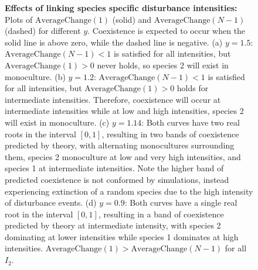 \begin{figure}[htbp]
\caption[Effects of linking species specific disturbance intensities]{\textbf{Effects of linking species specific disturbance intensities:} Plots of $\text{AverageChange}(1)$ (solid) and $\text{AverageChange}(N-1)$ (dashed) for different $y$. Coexistence is expected to occur when the solid line is above zero, while the dashed line is negative. (a) $y=1.5$: $\text{AverageChange}(N-1)<1$ is satisfied for all intensities, but $\text{AverageChange}(1)>0$ never holds, so species 2 will exist in monoculture. (b) $y=1.2$:  $\text{AverageChange}(N-1)<1$ is satisfied for all intensities, but $\text{AverageChange}(1)>0$ holds for intermediate intensities. Therefore, coexistence will occur at intermediate intensities while at low and high intensities, species 2 will exist in monoculture. (c) $y=1.14$: Both curves have two real roots in the interval $[0,1]$, resulting in two bands of coexistence predicted by theory, with alternating monocultures surrounding them, species 2 monoculture at low and very high intensities, and species 1 at intermediate intensities. Note the higher band of predicted coexistence is not conformed by simulations, instead experiencing extinction of a random species due to the high intensity of disturbance events. (d) $y=0.9$: Both curves have a single real root in the interval $[0,1]$, resulting in a band of coexistence predicted by theory at intermediate intensity, with species 2 dominating at lower intensities while species 1 dominates at high intensities. $\text{AverageChange}(1)>\text{AverageChange}(N-1)$ for all $I_2$.}
\label{linked}
\end{figure}

